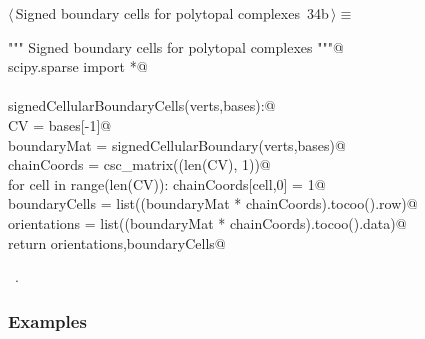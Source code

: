 \documentclass[11pt,oneside]{article}	%
\begin{document}
\begin{flushleft} \small \label{scrap55}
\protect{}$\langle\,$Signed boundary cells for polytopal complexes\nobreak\ {\footnotesize 34b}$\,\rangle\equiv$
\vspace{-1ex}
\begin{list}{}{} \item
\mbox{}\verb@""" Signed boundary cells for polytopal complexes """@\\
\mbox{}\verb@from scipy.sparse import *@\\
\mbox{}\verb@@\\
\mbox{}\verb@def signedCellularBoundaryCells(verts,bases):@\\
\mbox{}\verb@   CV = bases[-1]@\\
\mbox{}\verb@   boundaryMat = signedCellularBoundary(verts,bases)@\\
\mbox{}\verb@   chainCoords = csc_matrix((len(CV), 1))@\\
\mbox{}\verb@   for cell in range(len(CV)): chainCoords[cell,0] = 1@\\
\mbox{}\verb@   boundaryCells = list((boundaryMat * chainCoords).tocoo().row)@\\
\mbox{}\verb@   orientations = list((boundaryMat * chainCoords).tocoo().data)@\\
\mbox{}\verb@   return orientations,boundaryCells@\\
\mbox{}\verb@@{\NWsep}
\end{list}
\vspace{-1ex}
\footnotesize\addtolength{\baselineskip}{-1ex}
\begin{list}{}{\setlength{\itemsep}{-\parsep}\setlength{\itemindent}{-\leftmargin}}
\item \NWtxtMacroRefIn\ .
\end{list}
\end{flushleft}

\subsubsection{Examples}
\end{document}

